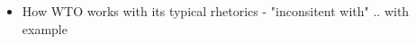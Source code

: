 \begin{itemize}
    \item How WTO works with its typical rhetorics - "inconsitent with" .. with example
\end{itemize}